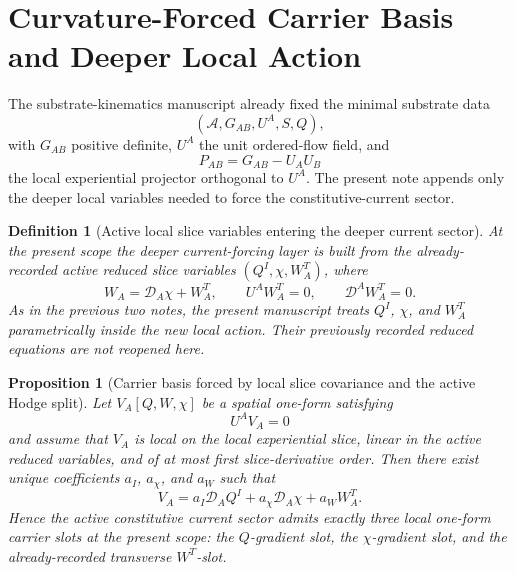 \documentclass[11pt]{article}
\newcommand{\Sub}{\mathcal{A}}
\newcommand{\ProjSub}{P}
\newcommand{\SpatialD}{\mathcal D}
\newtheorem{definition}{Definition}
\newtheorem{proposition}{Proposition}
\begin{document}
\section{Curvature-Forced Carrier Basis and Deeper Local Action}

The substrate-kinematics manuscript already fixed the minimal substrate data
\[
(\Sub,G_{AB},U^A,S,Q),
\]
with \(G_{AB}\) positive definite, \(U^A\) the unit ordered-flow field, and
\begin{equation}
\ProjSub_{AB}=G_{AB}-U_AU_B
\label{eq:projector}
\end{equation}
the local experiential projector orthogonal to \(U^A\). The present note appends only the deeper local variables needed to force the constitutive-current sector.

\begin{definition}[Active local slice variables entering the deeper current sector]
\label{def:activeslice}
At the present scope the deeper current-forcing layer is built from the already-recorded active reduced slice variables \((Q^I,\chi,W_A^T)\), where
\begin{equation}
W_A=\SpatialD_A\chi+W_A^T,
\qquad
U^AW_A^T=0,
\qquad
\SpatialD^AW_A^T=0.
\label{eq:Wdecomp}
\end{equation}
As in the previous two notes, the present manuscript treats \(Q^I\), \(\chi\), and \(W_A^T\) parametrically inside the new local action. Their previously recorded reduced equations are not reopened here.
\end{definition}

\begin{proposition}[Carrier basis forced by local slice covariance and the active Hodge split]
\label{prop:basis}
Let \(V_A[Q,W,\chi]\) be a spatial one-form satisfying
\begin{equation}
U^AV_A=0
\label{eq:spatialV}
\end{equation}
and assume that \(V_A\) is local on the local experiential slice, linear in the active reduced variables, and of at most first slice-derivative order. Then there exist unique coefficients \(a_I\), \(a_\chi\), and \(a_W\) such that
\begin{equation}
V_A
=
a_I\SpatialD_AQ^I
+a_\chi\SpatialD_A\chi
+a_WW_A^T.
\label{eq:basisdecomp}
\end{equation}
Hence the active constitutive current sector admits exactly three local one-form carrier slots at the present scope: the \(Q\)-gradient slot, the \(\chi\)-gradient slot, and the already-recorded transverse \(W^T\)-slot.
\end{proposition}
\end{document}
